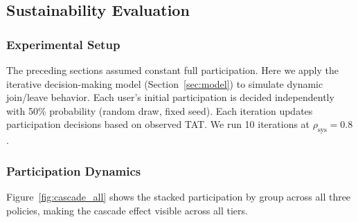 
\subsection{Sustainability Evaluation}
\label{sec:sustainability}


\subsubsection{Experimental Setup}

The preceding sections assumed constant full participation.
Here we apply the iterative decision-making model
(Section~\ref{sec:model}) to simulate dynamic join/leave behavior.
Each user's initial participation is decided independently with 50\% probability
(random draw, fixed seed).
Each iteration updates participation decisions based on observed TAT.
We run 10 iterations at $\rho_\mathrm{sys} = 0.8$.

%

\subsubsection{Participation Dynamics}

Figure~\ref{fig:cascade_all} shows the stacked participation by group
across all three policies, making the cascade effect visible across all tiers.

